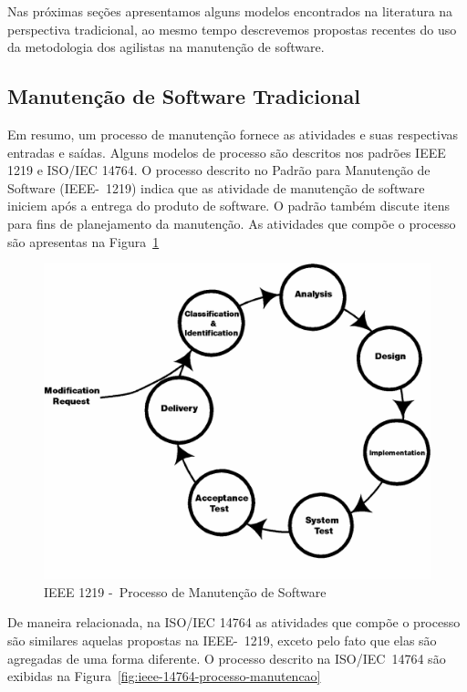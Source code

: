 Nas próximas seções apresentamos alguns modelos encontrados na literatura na perspectiva
tradicional, ao mesmo tempo descrevemos propostas recentes do uso da metodologia dos agilistas na
manutenção de software. 

\subsection{Manutenção de Software Tradicional}
\label{subsec:manutenção_de_software_tradicional}

Em resumo, um processo de manutenção fornece as atividades e suas respectivas entradas e saídas.
Alguns modelos de processo são descritos nos padrões IEEE 1219 e ISO/IEC 14764. O processo descrito
no Padrão para Manutenção de Software (IEEE-~1219) indica que as atividade de manutenção de software
iniciem após a entrega do produto de software. O padrão também discute itens para fins de
planejamento da manutenção. As atividades que compõe o processo são apresentas na
Figura~\ref{fig:ieee-1219-processo-man-software}

\begin{figure}[htpb]
	\centering
	\includegraphics[width=0.8\linewidth]{chapter-manutencao-software-visao-geral/img/ieee-1219-98-processo-manutencao.png}
	\caption{IEEE 1219 -~Processo de Manutenção de Software}
	\label{fig:ieee-1219-processo-man-software}
\end{figure}

De maneira relacionada, na ISO/IEC 14764 as atividades que compõe o processo são similares aquelas
propostas na IEEE-~1219, exceto pelo fato que elas são agregadas de uma forma diferente. O processo
descrito na ISO/IEC~14764 são exibidas na Figura~\ref{fig:ieee-14764-processo-manutencao}

